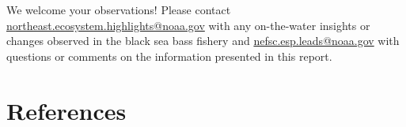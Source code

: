 \documentclass[
  10pt,
  letterpaper,
  DIV=11,
  numbers=noendperiod]{scrartcl}
\begin{document}
\centering\normalsize

We welcome your observations! Please contact
\url{northeast.ecosystem.highlights@noaa.gov} with any on-the-water
insights or changes observed in the black sea bass fishery and
\url{nefsc.esp.leads@noaa.gov} with questions or comments on the
information presented in this report.

\newpage
{}


\section{References}\label{references}
\end{document}
